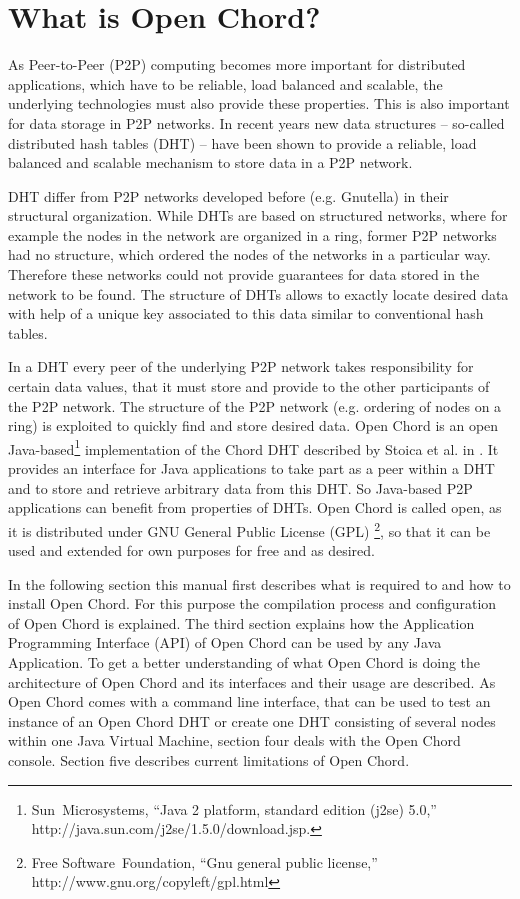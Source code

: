\section{What is Open Chord?}
As Peer-to-Peer (P2P) computing becomes more important for distributed applications, 
which have to be reliable, load balanced and scalable, the underlying technologies 
must also provide these properties. 
This is also important for data storage in P2P networks. In recent years new data 
structures -- so-called distributed hash tables (DHT) -- have been shown to provide a 
reliable, load balanced and scalable mechanism to store data in a P2P network. 

DHT differ from P2P networks developed before (e.g. Gnutella) in their structural 
organization. While DHTs are based on structured networks, where for example the nodes 
in the network are organized in a ring, former P2P networks had no structure, which 
ordered the nodes of the networks in a particular way. Therefore these networks could 
not provide guarantees for data stored in the network to be found. The structure of DHTs allows to exactly locate desired data with help of a unique key associated to 
this data similar to conventional hash tables. 

In a DHT every peer of the underlying P2P network takes responsibility for certain data 
values, that it must store and provide to the other participants of the P2P network. 
The structure of the P2P network (e.g. ordering of nodes on a ring) is exploited 
to quickly find and store desired data. 
Open Chord is an open Java-based\footnote{Sun~Microsystems, ``Java 2 platform, standard edition (j2se) 5.0,'' http://java.sun.com/j2se/1.5.0/download.jsp.} 
implementation of the Chord DHT described by Stoica et al. in \cite{stoica01chord}. It provides an interface for Java applications to take part as a peer within a DHT and to store and retrieve arbitrary data from this DHT. So Java-based P2P applications can benefit from properties of DHTs. 
Open Chord is called open, as it is distributed under GNU General Public License (GPL)
\footnote{Free Software~Foundation, ``Gnu general public license,'' 
http://www.gnu.org/copyleft/gpl.html}, so that it can be used and extended for own purposes for free and as desired. 

In the following section this manual first describes what is required to and how to install Open Chord. For this purpose the compilation process and configuration of Open Chord is explained. The third section explains how the Application Programming 
Interface (API) of Open Chord can be used by any Java Application. To get a better 
understanding of what Open Chord is doing the architecture of Open Chord and its 
interfaces and their usage are described. As Open Chord comes with a command line 
interface, that can be used to test an instance of an Open Chord DHT or create one DHT 
consisting of several nodes within one Java Virtual Machine, section four deals with 
the Open Chord console. Section five describes current limitations of Open Chord.  

